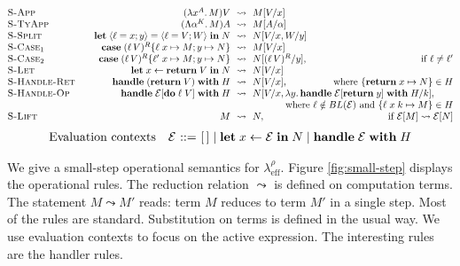 \documentclass[12pt,mscres,cdtppar,twoside,openright,logo,rightchapter,normalheadings]{infthesis}
\makeatletter
\theoremstyle{definition}
\newcommand{\Calc}{\ensuremath{\lambda_{\text{eff}}^\rho}\xspace}
\newcommand{\slab}[1]{\textrm{#1}}
\newcommand{\semlab}[1]{\text{\scshape{S-#1}}}
\newcommand{\revto}{\ensuremath{\leftarrow}}
\newcommand{\keyw}[1]{\textbf{#1}}
\newcommand{\Handle}{\keyw{handle}}
\newcommand{\With}{\keyw{with}}
\newcommand{\Let}{\keyw{let}}
\newcommand{\In}{\keyw{in}}
\newcommand{\Do}{\keyw{do}}
\newcommand{\Return}{\keyw{return}}
\newcommand{\Case}{\keyw{case}}
\newcommand{\Record}[1]{\ensuremath{\langle #1 \rangle}}
\newcommand{\reducesto}[0]{\ensuremath{\leadsto}}
\newcommand{\ba}{\begin{array}}
\newcommand{\ea}{\end{array}}
\newenvironment{syntax}{\[\ba{@{}l@{\quad}r@{~}c@{~}l@{}}}{\ea\]\ignorespacesafterend}
\newenvironment{reductions}{\[\ba{@{}l@{\qquad}@{}r@{~~}c@{~~}l@{}}}{\ea\]\ignorespacesafterend}
\makeatother
\begin{document}
\begin{figure*}

\begin{reductions}
\semlab{App}   & (\lambda x^A . \, M) V &\reducesto& M[V/x] \\
\semlab{TyApp} & (\Lambda \alpha^K . \, M) A &\reducesto& M[A/\alpha] \\
\semlab{Split} & \Let \; \Record{\ell = x;y} = \Record{\ell = V;W} \; \In \; N &\reducesto& N[V/x,W/y] \\
\semlab{Case$_1$} &
  \Case \; (\ell\, V)^R \{ \ell \; x \mapsto M; y \mapsto N\} &\reducesto& M[V/x] \\
\semlab{Case$_2$} &
  \Case \; (\ell\, V)^R \{ \ell' \; x \mapsto M; y \mapsto N\} &\reducesto& N[(\ell\, V)^R/y], \hfill\quad \text{if } \ell \neq \ell' \\
\semlab{Let} &
  \Let \; x \revto \Return \; V \; \In \; N &\reducesto& N[V/x] \\
\semlab{Handle-Ret} &
  \Handle \; (\Return \; V) \; \With \; H &\reducesto& N[V/x], \hfill\quad \text{where } \{ \Return \; x \mapsto N \} \in H \\
\semlab{Handle-Op} &
  \Handle \; \mathcal{E}[\Do \; \ell \; V] \; \With \; H
    &\reducesto& N[V/x, \lambda y . \, \Handle \; \mathcal{E}[\Return \; y] \; \With \; H/k],\qquad \\
  \multicolumn{4}{@{}r@{}}
      {\text{where } \ell \notin BL(\mathcal{E}) \text{ and } \{ \ell \; x \; k \mapsto M \} \in H} \\
\semlab{Lift} &
  M &\reducesto& N, \hfill \text{if }\mathcal{E}[M] \reducesto \mathcal{E}[N] \\
\end{reductions}
\begin{syntax}
\slab{Evaluation contexts} &  \mathcal{E} &::=& [\,] \mid \Let \; x \revto \mathcal{E} \; \In \; N \mid \Handle \; \mathcal{E} \; \With \; H
\end{syntax}

\caption{Small-Step Operational Semantics}
\label{fig:small-step}
\end{figure*}
We give a small-step operational semantics for \Calc. Figure
\ref{fig:small-step} displays the operational rules. The reduction
relation $\reducesto$ is defined on computation terms. The statement
$M \reducesto M'$ reads: term $M$ reduces to term $M'$ in a single
step. Most of the rules are standard. Substitution on terms is defined
in the usual way. We use evaluation contexts to focus on the active
expression. The interesting rules are the handler rules.
\end{document}
